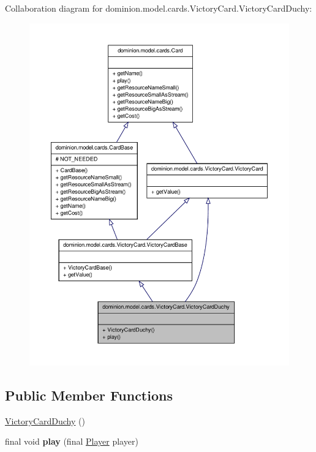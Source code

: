 \-Collaboration diagram for dominion.\-model.\-cards.\-Victory\-Card.\-Victory\-Card\-Duchy\-:
\nopagebreak
\begin{figure}[H]
\begin{center}
\leavevmode
\includegraphics[width=350pt]{classdominion_1_1model_1_1cards_1_1VictoryCard_1_1VictoryCardDuchy__coll__graph}
\end{center}
\end{figure}
\subsection*{\-Public \-Member \-Functions}
\begin{DoxyCompactItemize}
\item 
\hyperlink{classdominion_1_1model_1_1cards_1_1VictoryCard_1_1VictoryCardDuchy_ab6412e2eb226a6bc2c5955b4106ca1aa}{\-Victory\-Card\-Duchy} ()
\item 
\hypertarget{classdominion_1_1model_1_1cards_1_1VictoryCard_1_1VictoryCardDuchy_a86497008482d7e2144a655934d58eb53}{final void {\bfseries play} (final \hyperlink{interfacedominion_1_1model_1_1Player}{\-Player} player)}\label{classdominion_1_1model_1_1cards_1_1VictoryCard_1_1VictoryCardDuchy_a86497008482d7e2144a655934d58eb53}

\end{DoxyCompactItemize}


